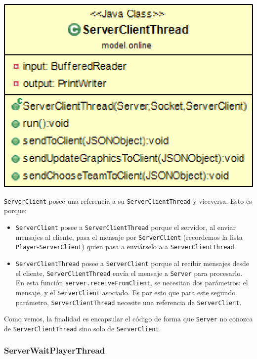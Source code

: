 \documentclass[../DocumentoOficial.tex]{subfiles}
\begin{document}
\begin{center}
\includegraphics[scale=0.3]{ServerClientThread-sprint7.png} 
\end{center}

\texttt{ServerClient} posee una referencia a su \texttt{ServerClientThread} y viceversa. Esto es porque:

\begin{itemize}
\item \texttt{ServerClient} posee a \texttt{ServerClientThread} porque el servidor, al enviar mensajes al cliente, pasa el mensaje por \texttt{ServerClient} (recordemos la lista \texttt{Player}-\texttt{ServerClient}) quien pasa a enviárselo a a \texttt{ServerClientThread}.
\item \texttt{ServerClientThread} posee a \texttt{ServerClient} porque al recibir mensajes desde el cliente, \texttt{ServerClientThread} envía el mensaje a \texttt{Server} para procesarlo. En esta función \texttt{server.receiveFromClient}, se necesitan dos parámetros: el mensaje, y el \texttt{ServerClient} asociado. Es por esto que para este segundo parámetro, \texttt{ServerClientThread} necesite una referencia de \texttt{ServerClient}.
\end{itemize}

Como vemos, la finalidad es encapsular el código de forma que \texttt{Server} no conozca de \texttt{ServerClientThread} sino solo de \texttt{ServerClient}.

\subsubsection{ServerWaitPlayerThread}
\end{document}
